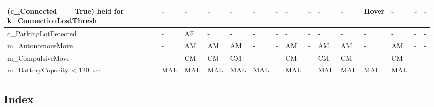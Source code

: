 \documentclass{article}
\begin{document}
\begin{landscape}
\begin{table}[!h]
\begin{center}
\begin{tabular}{ | m{3cm} | m{1cm} | m{0.7cm} | m{1cm} | m{1cm} | m{1cm} | m{0.5cm} | m{1.5cm} | m{1cm} | m{0.8cm} | m{1.5cm} |  m{1.3cm} | m{1cm} | m{0.7cm} | m{0.8cm} |}
\hline
(c\_Connected == True) held for k\_ConnectionLostThresh & - & - & - & - & - & - & - & - & - & - & Hover & - & - & - \\
\hline
c\_ParkingLotDetected  & - & AE & - & - & - & - & - & - & - & - & -  & - & - & -\\
\hline
m\_AutonomousMove & - & AM & AM & AM & - & - & AM & - & AM & AM & -  & AM & - & -\\
\hline
m\_CompulsiveMove & - & CM & CM & CM & - & - & CM & - & CM & CM & -  & CM & - & -\\
\hline
m\_BatteryCapacity < 120 sec  & MAL & MAL & MAL & MAL & MAL & - & MAL & - & MAL & MAL & MAL  & MAL & - & -\\
\hline
\end{tabular}
\end{center}
\end{table}
\end{landscape}

\subsection{Index}


\end{document}
